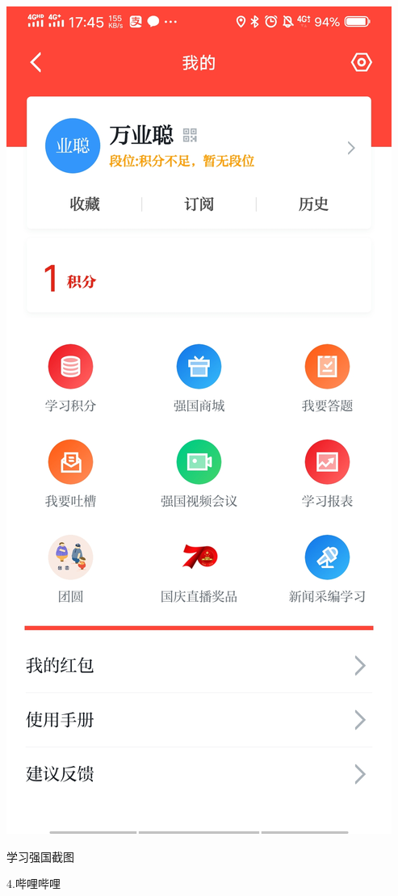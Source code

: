 \documentclass{article}
\begin{document}
\makeatother
\includegraphics[scale=0.1]{xuexiqiangguo}
\caption{学习强国截图}
\label{fig:xuexiqiangguo}
4.哔哩哔哩
\makeatletter

\def\@captype{figure}
\end{document}
